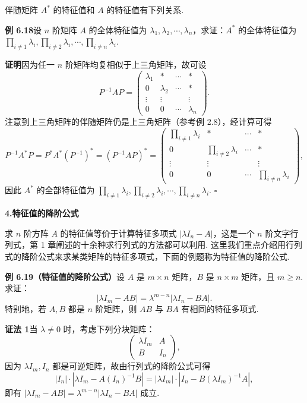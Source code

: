 \documentclass[UTF8,12pt,a4paper,fontset=fandol]{ctexart}
\begin{document}
伴随矩阵 $A^*$ 的特征值和 $A$ 的特征值有下列关系.

\noindent\textbf{例 6.18}\quad 设 $n$ 阶矩阵 $A$ 的全体特征值为 $\lambda_1,\lambda_2,\cdots,\lambda_n$，求证：$A^*$ 的全体特征值为 $\prod_{i\ne 1}\lambda_i,\prod_{i\ne 2}\lambda_i,\cdots,\prod_{i\ne n}\lambda_i$.

\noindent\textbf{证明}\quad 因为任一 $n$ 阶矩阵均复相似于上三角矩阵，故可设
\[
P^{-1}AP=\left(\begin{array}{cccc}
\lambda_1 & * & \cdots & *\\
0 & \lambda_2 & \cdots & *\\
\vdots & \vdots & & \vdots\\
0 & 0 & \cdots & \lambda_n
\end{array}\right).
\]
注意到上三角矩阵的伴随矩阵仍是上三角矩阵（参考例 2.8），经计算可得
\[
P^{-1}A^*P=P^*A^*(P^{-1})^*=(P^{-1}AP)^*
=\left(\begin{array}{cccc}
\prod_{i\ne 1}\lambda_i & * & \cdots & *\\
0 & \prod_{i\ne 2}\lambda_i & \cdots & *\\
\vdots & \vdots & & \vdots\\
0 & 0 & \cdots & \prod_{i\ne n}\lambda_i
\end{array}\right),
\]
因此 $A^*$ 的全部特征值为 $\prod_{i\ne 1}\lambda_i,\prod_{i\ne 2}\lambda_i,\cdots,\prod_{i\ne n}\lambda_i$. $\square$

\noindent\textbf{4.\quad 特征值的降阶公式}

求 $n$ 阶方阵 $A$ 的特征值等价于计算特征多项式 $|\lambda I_n-A|$，这是一个 $n$ 阶文字行列式，第 1 章阐述的十余种求行列式的方法都可以利用. 这里我们重点介绍用行列式的降阶公式来求某类矩阵的特征多项式，下面的例题称为特征值的降阶公式.

\noindent\textbf{例 6.19（特征值的降阶公式）}\quad 设 $A$ 是 $m\times n$ 矩阵，$B$ 是 $n\times m$ 矩阵，且 $m\ge n$. 求证：
\[
|\lambda I_m-AB|=\lambda^{m-n}|\lambda I_n-BA|.
\]
特别地，若 $A,B$ 都是 $n$ 阶矩阵，则 $AB$ 与 $BA$ 有相同的特征多项式.

\noindent\textbf{证法 1}\quad 当 $\lambda\ne 0$ 时，考虑下列分块矩阵：
\[
\left(\begin{array}{cc}
\lambda I_m & A\\
B & I_n
\end{array}\right),
\]
因为 $\lambda I_m,I_n$ 都是可逆矩阵，故由行列式的降阶公式可得
\[
|I_n|\cdot|\lambda I_m-A(I_n)^{-1}B|
=|\lambda I_m|\cdot|I_n-B(\lambda I_m)^{-1}A|,
\]
即有 $|\lambda I_m-AB|=\lambda^{m-n}|\lambda I_n-BA|$ 成立.
\end{document}
